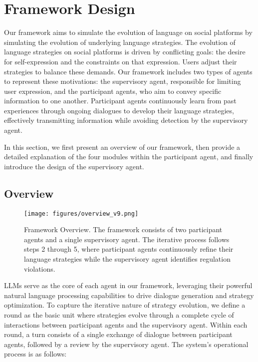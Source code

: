 \section{Framework Design}
\label{sec: method}
Our framework aims to simulate the evolution of language on social platforms by simulating the evolution of underlying language strategies.
The evolution of language strategies on social platforms is driven by conflicting goals: the desire for self-expression and the constraints on that expression. Users adjust their strategies to balance these demands. Our framework includes two types of agents to represent these motivations: the supervisory agent, responsible for limiting user expression, and the participant agents, who aim to convey specific information to one another. Participant agents continuously learn from past experiences through ongoing dialogues to develop their language strategies, effectively transmitting information while avoiding detection by the supervisory agent.

In this section, we first present an overview of our framework, then provide a detailed explanation of the four modules within the participant agent, and finally introduce the design of the supervisory agent.

\subsection{Overview}
\begin{figure*}[h]
    \centering
    \texttt{[image: figures/overview\_v9.png]}
    \caption{Framework Overview. The framework consists of two participant agents and a single supervisory agent. The iterative process follows steps 2 through 5, where participant agents continuously refine their language strategies while the supervisory agent identifies regulation violations.}
    \label{fig:overview}
\end{figure*}

LLMs serve as the core of each agent in our framework, leveraging their powerful natural language processing capabilities to drive dialogue generation and strategy optimization. To capture the iterative nature of strategy evolution, we define a round as the basic unit where strategies evolve through a complete cycle of interactions between participant agents and the supervisory agent. Within each round, a turn consists of a single exchange of dialogue between participant agents, followed by a review by the supervisory agent. The system's operational process is as follows:
 
